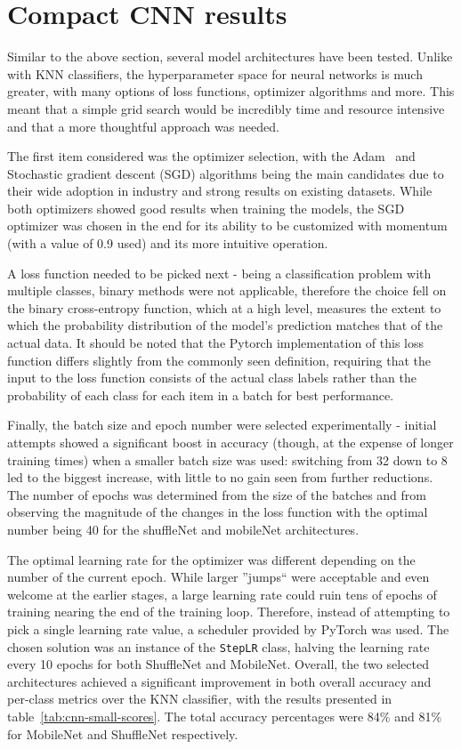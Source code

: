 \section{Compact CNN results}
\label{sec:compact-cnn-results}
Similar to the above section, several model architectures have been tested.
Unlike with KNN classifiers, the hyperparameter space for neural networks is much greater, with many options of loss functions,
optimizer algorithms and more.
This meant that a simple grid search would be incredibly time and resource intensive and that a more thoughtful approach was needed.

The first item considered was the optimizer selection, with the Adam~\cite{adamGrad} and Stochastic gradient descent (SGD) algorithms being
the main candidates due to their wide adoption in industry and strong results on existing datasets.
While both optimizers showed good results when training the models, the SGD optimizer was chosen in the end for its ability
to be customized with momentum (with a value of 0.9 used) and its more intuitive operation.

A loss function needed to be picked next - being a classification problem with multiple classes, binary methods were not applicable,
therefore the choice fell on the binary cross-entropy function, which at a high level, measures the extent to which the
probability distribution of the model's prediction matches that of the actual data.
It should be noted that the Pytorch implementation of this loss function differs slightly from the commonly seen definition,
requiring that the input to the loss function consists of the actual class labels rather than the probability of each class
for each item in a batch for best performance.

Finally, the batch size and epoch number were selected experimentally - initial attempts showed a significant boost in accuracy
(though, at the expense of longer training times) when a smaller batch size was used: switching from 32 down to 8 led
to the biggest increase, with little to no gain seen from further reductions.
The number of epochs was determined from the size of the batches and from observing the magnitude of the changes in the loss function
with the optimal number being 40 for the shuffleNet and mobileNet architectures.

The optimal learning rate for the optimizer was different depending on the number of the current epoch.
While larger ''jumps`` were acceptable and even welcome at the earlier stages, a large learning rate could ruin tens of epochs
of training nearing the end of the training loop.
Therefore, instead of attempting to pick a single learning rate value, a scheduler provided by PyTorch was used.
The chosen solution was an instance of the \verb|StepLR| class, halving the learning rate every 10 epochs for both
ShuffleNet and MobileNet.
Overall, the two selected architectures achieved a significant improvement in both overall accuracy and per-class
metrics over the KNN classifier, with the results presented in table~\ref{tab:cnn-small-scores}.
The total accuracy percentages were 84\% and 81\% for MobileNet and ShuffleNet respectively.

